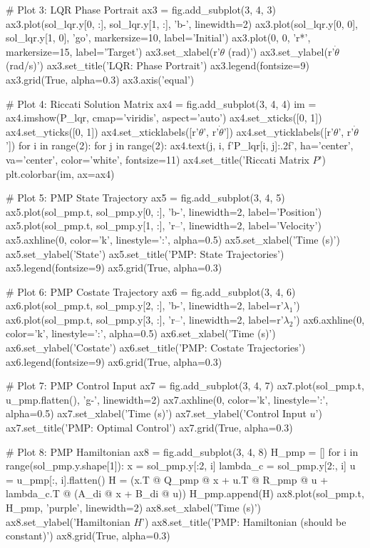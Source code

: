\documentclass[a4paper, 11pt]{article}
\begin{document}
\begin{pycode}
# Plot 3: LQR Phase Portrait
ax3 = fig.add_subplot(3, 4, 3)
ax3.plot(sol_lqr.y[0, :], sol_lqr.y[1, :], 'b-', linewidth=2)
ax3.plot(sol_lqr.y[0, 0], sol_lqr.y[1, 0], 'go', markersize=10, label='Initial')
ax3.plot(0, 0, 'r*', markersize=15, label='Target')
ax3.set_xlabel(r'$\theta$ (rad)')
ax3.set_ylabel(r'$\dot{\theta}$ (rad/s)')
ax3.set_title('LQR: Phase Portrait')
ax3.legend(fontsize=9)
ax3.grid(True, alpha=0.3)
ax3.axis('equal')

# Plot 4: Riccati Solution Matrix
ax4 = fig.add_subplot(3, 4, 4)
im = ax4.imshow(P_lqr, cmap='viridis', aspect='auto')
ax4.set_xticks([0, 1])
ax4.set_yticks([0, 1])
ax4.set_xticklabels([r'$\theta$', r'$\dot{\theta}$'])
ax4.set_yticklabels([r'$\theta$', r'$\dot{\theta}$'])
for i in range(2):
    for j in range(2):
        ax4.text(j, i, f'{P_lqr[i, j]:.2f}', ha='center', va='center', color='white', fontsize=11)
ax4.set_title('Riccati Matrix $P$')
plt.colorbar(im, ax=ax4)

# Plot 5: PMP State Trajectory
ax5 = fig.add_subplot(3, 4, 5)
ax5.plot(sol_pmp.t, sol_pmp.y[0, :], 'b-', linewidth=2, label='Position')
ax5.plot(sol_pmp.t, sol_pmp.y[1, :], 'r--', linewidth=2, label='Velocity')
ax5.axhline(0, color='k', linestyle=':', alpha=0.5)
ax5.set_xlabel('Time (s)')
ax5.set_ylabel('State')
ax5.set_title('PMP: State Trajectories')
ax5.legend(fontsize=9)
ax5.grid(True, alpha=0.3)

# Plot 6: PMP Costate Trajectory
ax6 = fig.add_subplot(3, 4, 6)
ax6.plot(sol_pmp.t, sol_pmp.y[2, :], 'b-', linewidth=2, label=r'$\lambda_1$')
ax6.plot(sol_pmp.t, sol_pmp.y[3, :], 'r--', linewidth=2, label=r'$\lambda_2$')
ax6.axhline(0, color='k', linestyle=':', alpha=0.5)
ax6.set_xlabel('Time (s)')
ax6.set_ylabel('Costate')
ax6.set_title('PMP: Costate Trajectories')
ax6.legend(fontsize=9)
ax6.grid(True, alpha=0.3)

# Plot 7: PMP Control Input
ax7 = fig.add_subplot(3, 4, 7)
ax7.plot(sol_pmp.t, u_pmp.flatten(), 'g-', linewidth=2)
ax7.axhline(0, color='k', linestyle=':', alpha=0.5)
ax7.set_xlabel('Time (s)')
ax7.set_ylabel('Control Input $u$')
ax7.set_title('PMP: Optimal Control')
ax7.grid(True, alpha=0.3)

# Plot 8: PMP Hamiltonian
ax8 = fig.add_subplot(3, 4, 8)
H_pmp = []
for i in range(sol_pmp.y.shape[1]):
    x = sol_pmp.y[:2, i]
    lambda_c = sol_pmp.y[2:, i]
    u = u_pmp[:, i].flatten()
    H = (x.T @ Q_pmp @ x + u.T @ R_pmp @ u +
         lambda_c.T @ (A_di @ x + B_di @ u))
    H_pmp.append(H)
ax8.plot(sol_pmp.t, H_pmp, 'purple', linewidth=2)
ax8.set_xlabel('Time (s)')
ax8.set_ylabel('Hamiltonian $H$')
ax8.set_title('PMP: Hamiltonian (should be constant)')
ax8.grid(True, alpha=0.3)


\end{pycode}
\end{document}
